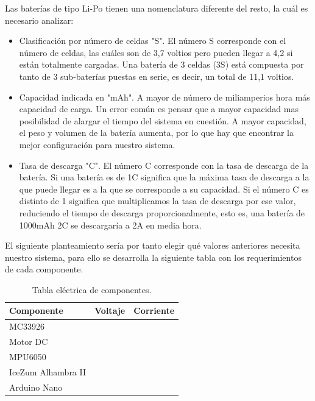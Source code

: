 Las baterías de tipo Li-Po tienen una nomenclatura diferente del resto, la cuál es necesario analizar:

\begin{itemize}
	\item Clasificación por número de celdas "S". El número S corresponde con el número de celdas, las cuáles son de 3,7 voltios pero pueden llegar a 4,2 si están totalmente cargadas. Una batería de 3 celdas (3S) está compuesta por tanto de 3 sub-baterías puestas en serie, es decir, un total de 11,1 voltios.
	\item Capacidad indicada en "mAh". A mayor de número de miliamperios hora más capacidad de carga. Un error común es pensar que a mayor capacidad mas posibilidad de alargar el tiempo del sistema en cuestión. A mayor capacidad, el peso y volumen de la batería aumenta, por lo que hay que encontrar la mejor configuración para nuestro sistema. 
	\item Tasa de descarga "C". El número C corresponde con la tasa de descarga de la batería. Si una batería es de 1C significa que la máxima tasa de descarga a la que puede llegar es a la que se corresponde a su capacidad. Si el número C es distinto de 1 significa que multiplicamos la tasa de descarga por ese valor, reduciendo el tiempo de descarga proporcionalmente, esto es, una batería de 1000mAh 2C se descargaría a 2A en media hora.
\end{itemize}

El siguiente planteamiento sería por tanto elegir qué valores anteriores necesita nuestro sistema, para ello se desarrolla la siguiente tabla con los requerimientos de cada componente.

\renewcommand\tablename{Tabla}
\begin{table}[H]
	\centering
	\begin{tabular}{|l|l|l|}
		\hline
		Componente         & Voltaje & Corriente \\ \hline
		MC33926            &         &           \\ \hline
		Motor DC           &         &           \\ \hline
		MPU6050            &         &           \\ \hline
		IceZum Alhambra II &         &           \\ \hline
		Arduino Nano       &         &           \\ \hline
	\end{tabular}
	\caption{Tabla eléctrica de componentes.}
	\label{tabla:Tabla}
\end{table}

